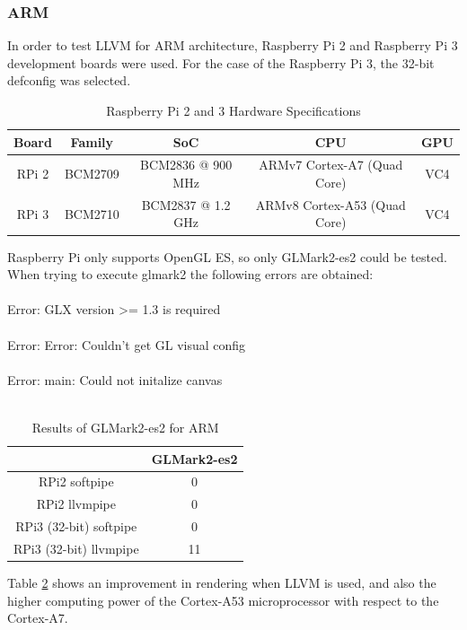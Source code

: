 \documentclass[12pt,a4paper,oneside]{article}
\begin{document}
\subsubsection*{ARM}
In order to test LLVM for ARM architecture, Raspberry Pi 2 and Raspberry Pi 3
development boards were used. For the case of the Raspberry Pi 3, the 32-bit
defconfig was selected.
\begin{table}[h!]
  \begin{center}
    \caption{Raspberry Pi 2 and 3 Hardware Specifications}
    \label{tab:rpi_specs}
    \begin{tabular}{c c c c c }
    Board & Family & SoC & CPU & GPU \\
    \hline
    RPi 2 & BCM2709 & BCM2836 @ 900 MHz & ARMv7 Cortex-A7 (Quad Core) & VC4 \\
    RPi 3 & BCM2710 & BCM2837 @ 1.2 GHz & ARMv8 Cortex-A53 (Quad Core) & VC4 \\
    \end{tabular}
  \end{center}
\end{table}
Raspberry Pi only supports OpenGL ES, so only GLMark2-es2 could be tested. When
trying to execute {\selectfont glmark2} the following errors are
obtained:\\\\
{\selectfont Error: GLX version >= 1.3 is required}\\\\
{\selectfont Error: Error: Couldn't get GL visual config}\\\\
{\selectfont Error: main: Could not initalize canvas}\\\\


\begin{table}[h!]
  \begin{center}
    \caption{Results of GLMark2-es2 for ARM}
    \label{tab:glmark2_ARM}
    \begin{tabular}{c|c}
    & {GLMark2-es2} \\
    \hline
    RPi2 softpipe & 0\\
    RPi2 llvmpipe & 0\\
    RPi3 (32-bit) softpipe & 0\\
    RPi3 (32-bit) llvmpipe & 11\\
    \end{tabular}
  \end{center}
\end{table}
Table \ref{tab:glmark2_ARM} shows an improvement in rendering when LLVM is used,
and also the higher computing power of the Cortex-A53 microprocessor with
respect to the Cortex-A7.
\end{document}
